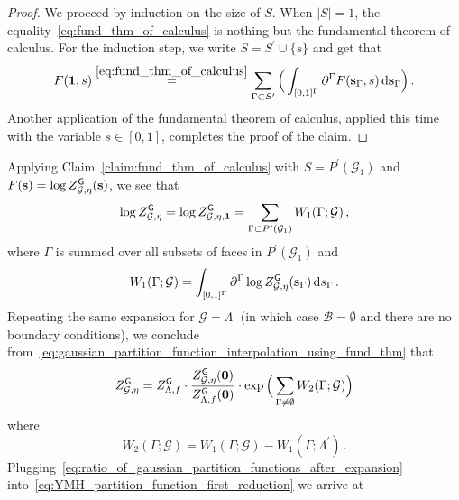 \documentclass[11pt]{article}
\theoremstyle{definition}
\theoremstyle{remark}
\numberwithin{theorem}{section}
\def\La{{\Lambda}}
\def\Ga{{\Gamma}}
\begin{document}
    \begin{proof}
        We proceed by induction on the size of $S$. When $|S|=1$, the equality~\eqref{eq:fund_thm_of_calculus} is nothing but the fundamental theorem of calculus. For the induction step, we write $S = S^\prime \cup \{s\}$ and get that
    \[
     F(\mathbf{1},s) \stackrel{\eqref{eq:fund_thm_of_calculus}}{=} \sum_{\Ga\subset S^\prime} \Big(\int_{[0,1]^{\Ga}} \partial^\Ga  F(\mathbf{s}_{\Ga},s) \, {\rm d} \mathbf{s}_{\Ga} \Big) \, .
    \]
    Another application of the fundamental theorem of calculus, applied this time with the variable $s\in[0,1]$, completes the proof of the claim. 
    \end{proof}
    Applying Claim~\ref{claim:fund_thm_of_calculus} with $S = P^\prime(\mathcal{G}_1)$ and $F(\mathbf{s}) = \log Z_{\mathcal{G},\eta}^{\sf G}(\mathbf{s})$, we see that
    \begin{equation}
        \label{eq:gaussian_partition_function_interpolation_using_fund_thm}
        \log Z_{\mathcal{G},\eta}^{\sf G} = \log Z_{\mathcal{G},\eta,\mathbf{1}}^{\sf G} = \sum_{\Gamma \subset P^\prime(\mathcal{G}_1)} W_1(\Ga;\mathcal{G}) \, ,
    \end{equation}
    where $\Ga$ is summed over all subsets of faces in $P^\prime(\mathcal{G}_1)$ and
    \begin{equation}
        \label{eq:def_of_W_1}
        W_1(\Ga;\mathcal{G}) = \int_{[0,1]^{\Gamma}} \partial^\Gamma \log   Z_{\mathcal{G},\eta}^{\sf G}(\mathbf{s}_{\Ga}) \,  {\rm d} s_{\Ga} \, .
    \end{equation}
    Repeating the same expansion for $\mathcal{G} = \La^\prime$ (in which case $\mathcal{B} = \emptyset$ and there are no boundary conditions), we conclude from~\eqref{eq:gaussian_partition_function_interpolation_using_fund_thm} that 
    \begin{equation}
    \label{eq:ratio_of_gaussian_partition_functions_after_expansion}
        Z_{\mathcal{G},\eta}^{\sf G} = Z_{\Lambda,f}^{\sf G}\cdot \frac{Z_{\mathcal{G},\eta}^{\sf G}(\mathbf{0})}{Z_{\Lambda,f}^{\sf G}(\mathbf{0})} \cdot \exp\Big( \sum_{\Ga\not=\emptyset} W_2(\Ga;\mathcal{G}) \Big)
    \end{equation}
    where
    \begin{equation}
        \label{eq:def_of_W_2}
        W_2(\Ga;\mathcal{G}) = W_1(\Ga;\mathcal{G}) - W_1(\Ga;\Lambda^\prime) \, .
    \end{equation}
    Plugging~\eqref{eq:ratio_of_gaussian_partition_functions_after_expansion} into~\eqref{eq:YMH_partition_function_first_reduction} we arrive at
\end{document}
